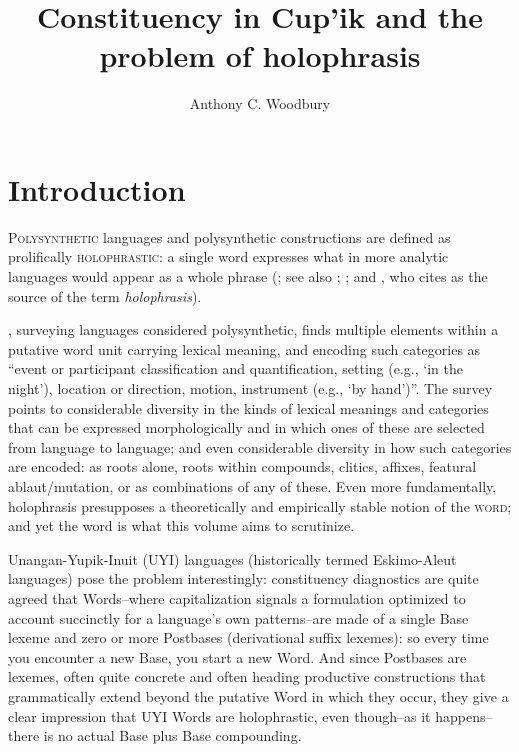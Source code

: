 \documentclass[output=paper]{langscibook}
\author{Anthony C. Woodbury\affiliation{University of Texas at Austin}}
\title{Constituency in Cup'ik and the problem of holophrasis}
\begin{document}
\maketitle 


\section{Introduction} 
\label{sec:1}

\textsc{Polysynthetic} languages and polysynthetic constructions are defined as prolifically  \textsc{holophrastic}: a single word expresses what in more analytic languages would appear as a whole phrase (\citealt{Duponceau1819}; see also \citealt{Boas1911}; \citealt{Fortescue1994}; and \citealt{Mithun2009}, who cites \citealt{Lieber1853} as the source of the term \textit{holophrasis}).

\citet{Mattissen2004, Mattissen2006, Mattissen2017}, surveying languages considered polysynthetic, finds multiple elements within a putative word unit carrying lexical meaning, and encoding such categories as ``event or participant classification and quantification, setting (e.g., `in the night'), location or direction, motion, instrument (e.g., `by hand')''. The survey points to considerable diversity in the kinds of lexical meanings and categories that can be expressed morphologically and in which ones of these are selected from language to language; and even considerable diversity in how such categories are encoded: as roots alone, roots within compounds, clitics, affixes, featural ablaut/mutation, or as combinations of any of these. Even more fundamentally, holophrasis presupposes a theoretically and empirically stable notion of the \textsc{word}; and yet the word is what this volume aims to scrutinize.

Unangan-Yupik-Inuit (UYI) languages (historically termed Eskimo-Aleut languages) pose the problem interestingly: constituency diagnostics are quite agreed that Words--where capitalization signals a formulation optimized to account succinctly for a language's own patterns--are made of a single Base lexeme and zero or more Postbases (derivational suffix lexemes): so every time you encounter a new Base, you start a new Word. And since Postbases are lexemes, often quite concrete and often heading productive constructions that grammatically extend beyond the putative Word in which they occur, they give a clear impression that UYI Words are holophrastic, even though--as it happens--there is no actual Base plus Base compounding.
\end{document}
